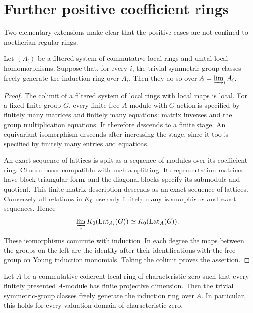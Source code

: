 \section{Further positive coefficient rings}

Two elementary extensions make clear that the positive cases are
not confined to noetherian regular rings.

\begin{proposition}\label{prop:filtered-colimits}
Let $(A_i)$ be a filtered system of commutative local rings and
unital local homomorphisms.  Suppose that, for every $i$, the
trivial symmetric-group classes freely generate the induction
ring over $A_i$.  Then they do so over $A=\varinjlim_iA_i$.
\end{proposition}

\begin{proof}
The colimit of a filtered system of local rings with local maps
is local.  For a fixed finite group $G$, every finite free
$A$-module with $G$-action is specified by finitely many matrices
and finitely many equations: matrix inverses and the group
multiplication equations.  It therefore descends to a finite
stage.  An equivariant isomorphism descends after increasing
the stage, since it too is specified by finitely many entries
and equations.

An exact sequence of lattices is split as a sequence of modules
over its coefficient ring.  Choose bases compatible with such
a splitting.  Its representation matrices have block triangular
form, and the diagonal blocks specify its submodule and
quotient.  This finite matrix description descends as an exact
sequence of lattices.  Conversely all relations in $K_0$ use
only finitely many isomorphisms and exact sequences.  Hence
\[
 \varinjlim_i K_0(\operatorname{Lat}_{A_i}(G))
 \simeq K_0(\operatorname{Lat}_A(G)).
\]
These isomorphisms commute with induction.  In each degree the
maps between the groups on the left are the identity after
their identifications with the free group on Young induction
monomials.  Taking the colimit proves the assertion.
\end{proof}

\begin{proposition}\label{prop:regular-coherent}
Let $A$ be a commutative coherent local ring of characteristic
zero such that every finitely presented $A$-module has finite
projective dimension.  Then the trivial symmetric-group
classes freely generate the induction ring over $A$.
In particular, this holds for every valuation domain of
characteristic zero.
\end{proposition}

